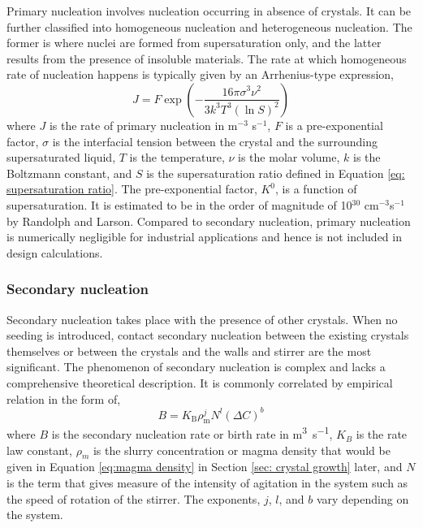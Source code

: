 Primary nucleation involves nucleation occurring in absence of crystals. \cite{seader_separation_2011} It can be further classified into homogeneous nucleation and heterogeneous nucleation. The former is where nuclei are formed from supersaturation only, and the latter results from the presence of insoluble materials. \cite{richardson_chemical_nodate} The rate at which homogeneous rate of nucleation happens is typically given by an Arrhenius-type expression, \cite{richardson_chemical_nodate}
\begin{equation}
     J = F\exp\left(-\frac{16 \pi \sigma^3 \nu^2}{3 k^3 T^3 (\ln S)^2}\right)
\end{equation}
where $J$ is the rate of primary nucleation in m$^{-3}$ s$^{-1}$, $F$ is a pre-exponential factor, $\sigma$ is the interfacial tension between the crystal and the surrounding supersaturated liquid, $T$ is the temperature, $\nu$ is the molar volume, $k$ is the Boltzmann constant, and $S$ is the supersaturation ratio defined in Equation \ref{eq: supersaturation ratio}. The pre-exponential factor, $K^0$, is a function of supersaturation. It is estimated to be in the order of magnitude of 10$^{30}$ cm$^{-3}$s$^{-1}$ by Randolph and Larson. \cite{randolph_theory_1971} Compared to secondary nucleation, primary nucleation is numerically negligible for industrial applications and hence is not included in design calculations. 

\subsubsection{Secondary nucleation}

Secondary nucleation takes place with the presence of other crystals. \cite{richardson_chemical_nodate} When no seeding is introduced, contact secondary nucleation between the existing crystals themselves or between the crystals and the walls and stirrer are the most significant. \cite{richardson_chemical_nodate} The phenomenon of secondary nucleation is complex and lacks a comprehensive theoretical description. It is commonly correlated by empirical relation in the form of, \cite{seader_separation_2011}
\begin{equation} \label{eq:secondary nucleation general}
    B = K_{\mathrm{B}} \rho^j_{\mathrm{m}} N^l (\Delta C)^b 
\end{equation}
where $B$ is the secondary nucleation rate or birth rate in \si{\cubic\m\per\s}, $K_B$ is the rate law constant, $\rho_m$ is the slurry concentration or magma density that would be given in Equation \ref{eq:magma density} in Section \ref{sec: crystal growth} later, and $N$ is the term that gives measure of the intensity of agitation in the system such as the speed of rotation of the stirrer. The exponents, $j$, $l$, and $b$ vary depending on the system.

